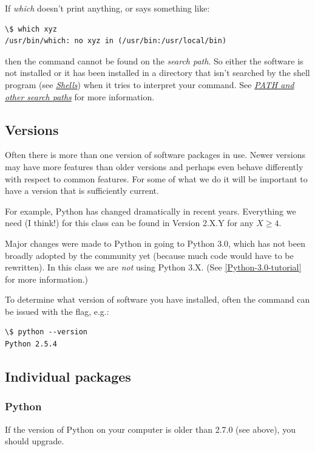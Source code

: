 \documentclass[letterpaper,10pt,english]{sphinxmanual}
\begin{document}
If \emph{which} doesn't print anything, or says something like:

\begin{Verbatim}[commandchars=\\\{\}]
\$ which xyz
/usr/bin/which: no xyz in (/usr/bin:/usr/local/bin)
\end{Verbatim}

then the command cannot be found on the \emph{search path}.  So either the
software is not installed or it has been installed in a directory that isn't
searched by the shell program (see {\hyperref[shells:shells]{\emph{Shells}}}) when it tries to interpret
your command.  See {\hyperref[unix:unix-path]{\emph{PATH and other search paths}}} for more information.


\subsection{Versions}
\label{software_installation:versions}
Often there is more than one version of software packages in use.  Newer
versions may have more features than older versions and perhaps even behave
differently with respect to common features.  For some of what we do it will
be important to have a version that is sufficiently current.

For example, Python has changed dramatically in recent years.  Everything we
need (I think!) for this class can be found in
Version 2.X.Y for any $X \geq 4$.

Major changes were made to Python in going to Python 3.0, which has not been
broadly adopted by the community yet (because much code would have to be
rewritten).  In this class we are \emph{not} using Python 3.X.  (See
{\hyperref[biblio:python-3-0-tutorial]{{[}Python-3.0-tutorial{]}}} for more information.)

To determine what version of software
you have installed, often the command can be issued with the 
flag, e.g.:

\begin{Verbatim}[commandchars=\\\{\}]
\$ python --version
Python 2.5.4
\end{Verbatim}


\subsection{Individual packages}
\label{software_installation:individual-packages}

\subsubsection{Python}
\label{software_installation:python}\label{software_installation:installing-python}
If the version of Python on your computer is older than 2.7.0 (see above),
you should upgrade.
\end{document}
